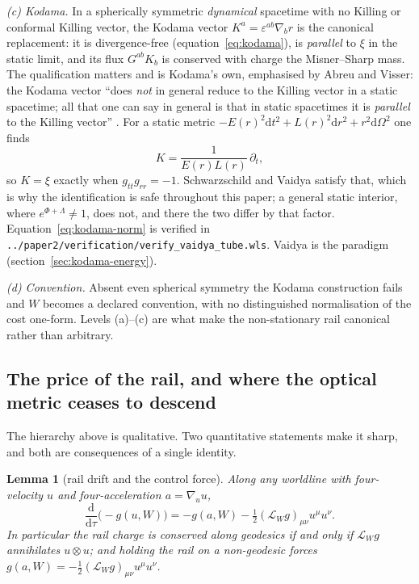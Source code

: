 \documentclass[12pt]{iopart}
\newcommand{\dd}{\mathrm{d}}
\theoremstyle{plain}
\theoremstyle{definition}
\theoremstyle{plain}
\newtheorem{auxlemma}{Lemma}
\theoremstyle{remark}
\begin{document}
\emph{(c) Kodama.} In a spherically symmetric \emph{dynamical} spacetime with no
Killing or conformal Killing vector, the Kodama vector
$K^a=\varepsilon^{ab}\nabla_b r$ \cite{Kodama1980,Hayward1996} is the canonical
replacement: it is divergence-free (equation~\eqref{eq:kodama}), is \emph{parallel}
to $\xi$ in the static limit, and its flux $G^{ab}K_b$ is conserved with charge the
Misner--Sharp mass. The qualification matters and is Kodama's own, emphasised by
Abreu and Visser: the Kodama vector ``does \emph{not} in general reduce to the
Killing vector in a static spacetime; all that one can say in general is that in
static spacetimes it is \emph{parallel} to the Killing vector''
\cite[\S III]{AbreuVisser2010}. For a static metric
$-E(r)^2\dd t^2+L(r)^2\dd r^2+r^2\dd\Omega^2$ one finds
\begin{equation}
    K=\frac{1}{E(r)L(r)}\,\partial_t ,
    \label{eq:kodama-norm}
\end{equation}
so $K=\xi$ exactly when $g_{tt}g_{rr}=-1$. Schwarzschild and Vaidya satisfy that,
which is why the identification is safe throughout this paper; a general static
interior, where $e^{\Phi+\Lambda}\neq1$, does not, and there the two differ by that
factor. Equation~\eqref{eq:kodama-norm} is verified in
\texttt{../paper2/verification/verify\_vaidya\_tube.wls}. Vaidya is the paradigm (section~\ref{sec:kodama-energy}).

\emph{(d) Convention.} Absent even spherical symmetry the Kodama construction
fails and $W$ becomes a declared convention, with no distinguished normalisation
of the cost one-form. Levels (a)--(c) are what make the non-stationary rail
canonical rather than arbitrary.

\subsection{The price of the rail, and where the optical metric ceases to descend}
\label{sec:price}
The hierarchy above is qualitative. Two quantitative statements make it sharp,
and both are consequences of a single identity.

\begin{auxlemma}[rail drift and the control force]\label{lem:drift}
Along any worldline with four-velocity $u$ and four-acceleration
$a=\nabla_uu$,
\begin{equation}
    \frac{\dd}{\dd\tau}\big(\!-\!g(u,W)\big)
      =-g(a,W)-\tfrac12(\mathcal L_Wg)_{\mu\nu}u^\mu u^\nu .
    \label{eq:drift-general}
\end{equation}
In particular the rail charge is conserved along \emph{geodesics} if and only if
$\mathcal L_Wg$ annihilates $u\otimes u$; and holding the rail on a non-geodesic
forces $g(a,W)=-\tfrac12(\mathcal L_Wg)_{\mu\nu}u^\mu u^\nu$.
\end{auxlemma}
\end{document}
